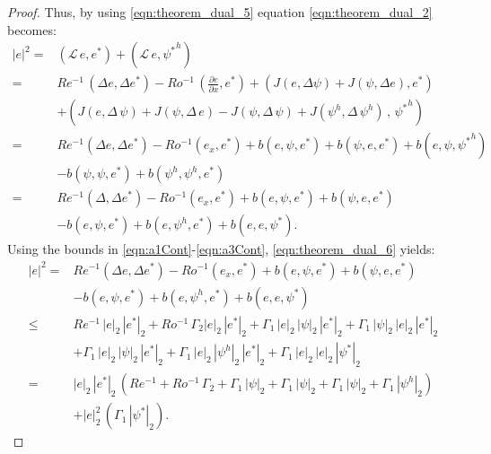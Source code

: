 \begin{proof}
  Thus, by using \eqref{eqn:theorem_dual_5} equation \eqref{eqn:theorem_dual_2}
  becomes:
  \begin{align}
    |e|^2 =& (\mathcal{L} \, e , e^*) + (\mathcal{L} \, e , {\psi^*}^h) \nonumber \\
    =& Re^{-1} \, (\Delta e , \Delta e^*)
      - Ro^{-1} \, \left( \frac{\partial e}{\partial x} , e^* \right)
      + \left( J(e , \Delta \psi) + J(\psi , \Delta e) , e^* \right) \nonumber \\
    & + \left( J(e , \Delta \, \psi) + J(\psi , \Delta \, e)
      - J(\psi , \Delta \, \psi) + J(\psi^h , \Delta \, \psi^h)
      \, , \, {\psi^*}^h \right) \nonumber \\
    =& Re^{-1} (\Delta e ,\Delta e^*) - Ro^{-1}(e_x , e^*)
      + b(e , \psi , e^*) + b(\psi , e, e^*) + b(e , \psi , {\psi^*}^h) \nonumber \\
    & - b(\psi , \psi , e^*) + b(\psi^h , \psi^h , e^*) \nonumber \\
    =& Re^{-1} (\Delta , \Delta e^*) - Ro^{-1}(e_x , e^*)
      + b(e , \psi , e^*) + b(\psi , e, e^*) \nonumber \\
    & - b(e , \psi , e^*) + b(e , \psi^h , e^*) + b(e , e , \psi^*).
    \label{eqn:theorem_dual_6}
  \end{align}
  Using the bounds in \eqref{eqn:a1Cont}-\eqref{eqn:a3Cont},
  \eqref{eqn:theorem_dual_6} yields:
  \begin{align}
    |e|^2 =& Re^{-1} (\Delta e ,\Delta e^*) - Ro^{-1} (e_x , e^*)
      + b(e , \psi , e^*) + b(\psi , e, e^*) \nonumber \\
    & - b(e , \psi , e^*) + b(e , \psi^h , e^*) + b(e , e , \psi^*) \nonumber \\
    \leq& Re^{-1} \, | e |_2 \, |e^* |_2 + Ro^{-1} \, \Gamma_2 | e |_2 \, |e^* |_2
      + \Gamma_1 \, | e |_2 \, | \psi |_2 \, | e^* |_2
      + \Gamma_1 \, | \psi |_2 \, | e |_2 \, | e^* |_2 \nonumber \\
    & + \Gamma_1 \, | e |_2 \, | \psi |_2 \, | e^* |_2
      + \Gamma_1 \, | e |_2 \, | \psi^h |_2 \, | e^* |_2
      + \Gamma_1 \, | e |_2 \, | e |_2 \, | \psi^* |_2 \nonumber \\
    =& | e |_2 \, |e^* |_2 \, \left( Re^{-1} + Ro^{-1}\, \Gamma_2 + \Gamma_1 \, | \psi |_2
      + \Gamma_1 \, | \psi |_2
      + \Gamma_1 \, | \psi |_2
      + \Gamma_1 \, | \psi^h |_2 \right) \nonumber \\
    & + | e |_2^2 \, \left( \Gamma_1 \, | \psi^* |_2 \right) .
    \label{eqn:theorem_dual_7}
  \end{align}

\end{proof}
